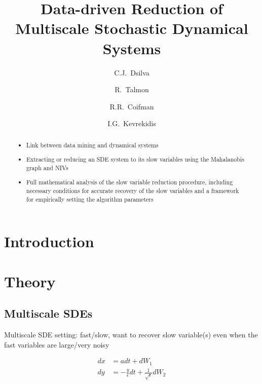 \documentclass[1p]{elsarticle}
\title{Data-driven Reduction of Multiscale Stochastic Dynamical Systems }
\author[PrincetonCBE]{C.J.~Dsilva}
\author[YaleMath]{R.~Talmon}
\author[YaleMath]{R.R.~Coifman}
\author[PrincetonCBE, PrincetonPACM]{I.G.~Kevrekidis\corref{cor1}}
\begin{document}
\begin{abstract}

\begin{itemize}

\item Link between data mining and dynamical systems

\item Extracting or reducing an SDE system to its slow variables using the Mahalanobis graph and NIVs

\item Full mathematical analysis of the slow variable reduction procedure, including necessary conditions for accurate recovery of the slow variables and a framework for empirically setting the algorithm parameters

\end{itemize}

\end{abstract}


\begin{keyword}
 
\end{keyword}

\maketitle

\section{Introduction}

\section{Theory}

\subsection{Multiscale SDEs}

Multiscale SDE setting: fast/slow, want to recover slow variable(s) even when the fast variables are large/very noisy

\begin{equation}
\begin{aligned}
dx &= adt + dW_1\\
dy &= -\frac{y}{\epsilon} dt + \frac{1}{\sqrt{\epsilon}} dW_2
\end{aligned}
\end{equation}
\end{document}
